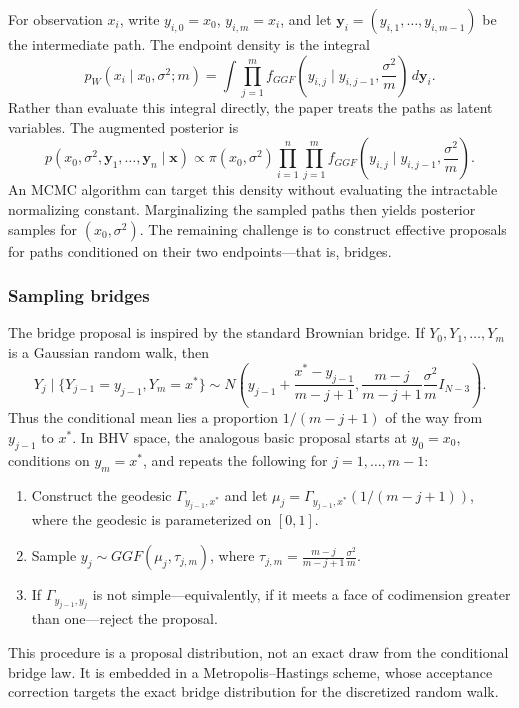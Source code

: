 For observation $x_i$, write $y_{i,0}=x_0$, $y_{i,m}=x_i$, and let
$\mathbf{y}_i=(y_{i,1},\ldots,y_{i,m-1})$ be the intermediate path. The
endpoint density is the integral
\[
  p_W(x_i\mid x_0,\sigma^2;m)
  =\int \prod_{j=1}^m
  f_{GGF}\!\left(y_{i,j}\mid y_{i,j-1},\frac{\sigma^2}{m}\right)
  \,d\mathbf{y}_i.
\]
Rather than evaluate this integral directly, the paper treats the paths as
latent variables. The augmented posterior is
\[
  p(x_0,\sigma^2,\mathbf{y}_1,\ldots,\mathbf{y}_n\mid\mathbf{x})
  \propto \pi(x_0,\sigma^2)
  \prod_{i=1}^n\prod_{j=1}^m
  f_{GGF}\!\left(y_{i,j}\mid y_{i,j-1},\frac{\sigma^2}{m}\right).
\]
An MCMC algorithm can target this density without evaluating the intractable
normalizing constant. Marginalizing the sampled paths then yields posterior
samples for $(x_0,\sigma^2)$. The remaining challenge is to construct effective
proposals for paths conditioned on their two endpoints---that is, bridges.

\subsubsection{Sampling bridges}

The bridge proposal is inspired by the standard Brownian bridge. If
$Y_0,Y_1,\ldots,Y_m$ is a Gaussian random walk, then
%
\[
Y_j\mid\{Y_{j-1}=y_{j-1},Y_m=x^*\}
\sim N\!\left(
y_{j-1}+\frac{x^*-y_{j-1}}{m-j+1},
\frac{m-j}{m-j+1}\frac{\sigma^2}{m}I_{N-3}
\right).
\]
%
\noindent Thus the conditional mean lies a proportion $1/(m-j+1)$ of the way
from $y_{j-1}$ to $x^*$. In BHV space, the analogous basic proposal starts at
$y_0=x_0$, conditions on $y_m=x^*$, and repeats the following for
$j=1,\ldots,m-1$:

\begin{enumerate}
    \item Construct the geodesic $\Gamma_{y_{j-1},x^*}$ and let
    $\mu_j=\Gamma_{y_{j-1},x^*}(1/(m-j+1))$, where the geodesic is
    parameterized on $[0,1]$.

    \item Sample $y_j\sim GGF(\mu_j,\tau_{j,m})$, where
    $\tau_{j,m}=\frac{m-j}{m-j+1}\frac{\sigma^2}{m}$.

    \item If $\Gamma_{y_{j-1},y_j}$ is not simple---equivalently, if it meets
    a face of codimension greater than one---reject the proposal.
\end{enumerate}

\noindent This procedure is a proposal distribution, not an exact draw from
the conditional bridge law. It is embedded in a Metropolis--Hastings scheme,
whose acceptance correction targets the exact bridge distribution for the
discretized random walk.

